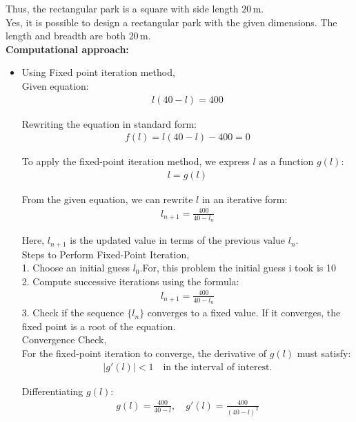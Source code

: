 \documentclass[article]{IEEEtran}
\numberwithin{figure}{enumi}
\begin{document}
Thus, the rectangular park is a square with side length $20 \, \text{m}$. \\
 
Yes, it is possible to design a rectangular park with the given dimensions. The length and breadth are both $20 \, \text{m}$.\\
\textbf{Computational approach: }
\begin{itemize}
\item Using Fixed point iteration method,\\
Given equation:  
\begin{align}
    l(40 - l) = 400
\end{align}

Rewriting the equation in standard form:  
\begin{align}
    f(l) = l(40 - l) - 400 = 0
\end{align}

To apply the fixed-point iteration method, we express $l$ as a function $g(l)$:  
\begin{align}
    l = g(l)
\end{align}

From the given equation, we can rewrite $l$ in an iterative form:  
\begin{align}
    l_{n+1} = \frac{400}{40 - l_n}
\end{align}

Here, $l_{n+1}$ is the updated value in terms of the previous value $l_n$.\\
Steps to Perform Fixed-Point Iteration,\\
1. Choose an initial guess $l_0$.For, this problem the initial guess i took is 10\\
2. Compute successive iterations using the formula:  
   \begin{align}
       l_{n+1} = \frac{400}{40 - l_n}
   \end{align}
3. Check if the sequence $\{l_n\}$ converges to a fixed value. If it converges, the fixed point is a root of the equation.\\
Convergence Check,\\
For the fixed-point iteration to converge, the derivative of $g(l)$ must satisfy:  
\begin{align}
    \left| g'(l) \right| < 1 \quad \text{in the interval of interest}.
\end{align}

Differentiating $g(l)$:  
\begin{align}
    g(l) = \frac{400}{40 - l}, \quad g'(l) = \frac{400}{(40 - l)^2}
\end{align}


\end{itemize}
\end{document}
